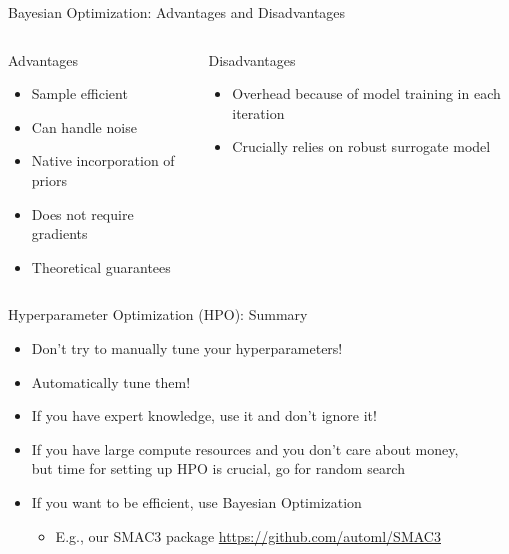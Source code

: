 \documentclass[aspectratio=169]{../latex_main/tntbeamer}  %
\begin{document}
\begin{frame}[c]{Bayesian Optimization: Advantages and Disadvantages}

\begin{columns}[T] %
\begin{column}{.48\textwidth}


\begin{block}{Advantages}
\begin{itemize}
  \item Sample efficient 
  \item Can handle noise
  \item Native incorporation of priors 
  \item Does not require gradients 
  \item Theoretical guarantees
\end{itemize}
\end{block}

\end{column}%

\hfill%
\pause 
\begin{column}{.48\textwidth}

\begin{block}{Disadvantages}
\begin{itemize}
  \item Overhead because of model training in each iteration 
  \item Crucially relies on robust surrogate model
\end{itemize}
\end{block}

\end{column}
\end{columns}

\end{frame}



\begin{frame}[c]{Hyperparameter Optimization (HPO): Summary}

\begin{itemize}
    \item Don't try to manually tune your hyperparameters! 
    \item Automatically tune them!
    \item If you have expert knowledge, use it and don't ignore it!
    \smallskip
    \item If you have large compute resources and you don't care about money,\\ but time for setting up HPO is crucial, go for random search
    \item If you want to be efficient, use Bayesian Optimization
    \begin{itemize}
        \item E.g., our SMAC3 package \url{https://github.com/automl/SMAC3}
    \end{itemize}
\end{itemize}

\end{frame}

\end{document}
